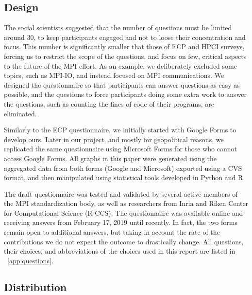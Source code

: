\documentclass[preprint,5p,times]{elsarticle}
\begin{document}
\subsection*{Design}
%
The social scientists suggested that the number of questions must be limited
around 30, to keep participants engaged and not to loose their concentration and
focus. This number is significantly smaller that those of ECP and HPCI surveys,
forcing us to restrict the scope of the questions, and focus on few, critical
aspects to the future of the MPI effort. As an example, we deliberately excluded
some topics, such as MPI-IO, and instead focused on MPI communications.
We designed the questionnaire so that participants can answer questions
as easy as possible, and the questions to force participants doing
some extra work to answer the questions, such as counting the lines of
code of their programs, are eliminated.

Similarly to the ECP questionnaire, we initially started with Google Forms to
develop ours. Later in our project, and mostly for geopolitical reasons, we
replicated the same questionnaire using Microsoft Forms for those who cannot
access Google Forms. All graphs in this paper were generated using the
aggregated data from both forms (Google and Microsoft) exported using a CVS
format, and then manipulated using statistical tools developed in Python and R.

The draft questionnaire was tested and validated by several active members of
the MPI standardization body, as well as researchers from Inria and Riken Center
for Computational Science (R-CCS).
The questionnaire was available online and receiving answers from February
17, 2019 until recently. In fact, the two forms remain open to additional
answers, but taking in account the rate of the contributions we do not expect
the outcome to drastically change.
All questions, their choices, and abbreviations of the choices used in
this report are listed in ~\ref{app:questions}.

\subsection*{Distribution}
\end{document}
